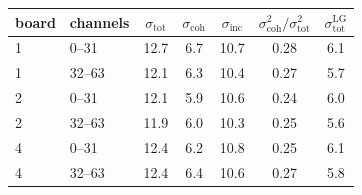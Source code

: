 \begin{tabular}{llccccc}
\toprule
board & channels & $\sigma_\mathrm{tot}$ & $\sigma_\mathrm{coh}$ & $\sigma_\mathrm{inc}$ & $\sigma_\mathrm{coh}^2/\sigma_\mathrm{tot}^2$ & $\sigma_\mathrm{tot}^\mathrm{LG}$ \\
\midrule
1 & 0--31 & 12.7 & 6.7 & 10.7 & 0.28 & 6.1 \\
1 & 32--63 & 12.1 & 6.3 & 10.4 & 0.27 & 5.7 \\
2 & 0--31 & 12.1 & 5.9 & 10.6 & 0.24 & 6.0 \\
2 & 32--63 & 11.9 & 6.0 & 10.3 & 0.25 & 5.6 \\
4 & 0--31 & 12.4 & 6.2 & 10.8 & 0.25 & 6.1 \\
4 & 32--63 & 12.4 & 6.4 & 10.6 & 0.27 & 5.8 \\
\bottomrule
\end{tabular}

